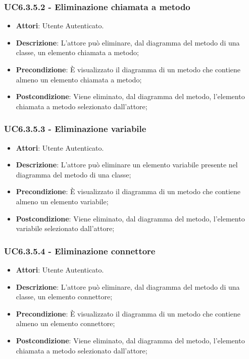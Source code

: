 \subsubsection{UC6.3.5.2 - Eliminazione chiamata a metodo} 
\label{sssec:UC6.3.5.2} 
\begin{itemize} 
\item \textbf{Attori}: Utente Autenticato.
\item \textbf{Descrizione}: L'attore può eliminare, dal diagramma del metodo di una classe, un elemento chiamata a metodo;
\item \textbf{Precondizione}: È visualizzato il diagramma di un metodo che contiene almeno un elemento chiamata a metodo;
\item \textbf{Postcondizione}: Viene eliminato, dal diagramma del metodo,  l'elemento chiamata a metodo selezionato dall'attore;
\end{itemize} 
\subsubsection{UC6.3.5.3 - Eliminazione variabile} 
\label{sssec:UC6.3.5.3} 
\begin{itemize} 
\item \textbf{Attori}: Utente Autenticato.
\item \textbf{Descrizione}: L'attore può eliminare un elemento variabile presente nel diagramma del metodo di una classe;
\item \textbf{Precondizione}: È visualizzato il diagramma di un metodo che contiene almeno un elemento variabile;
\item \textbf{Postcondizione}: Viene eliminato, dal diagramma del metodo,  l'elemento variabile selezionato dall'attore;
\end{itemize} 
\subsubsection{UC6.3.5.4 - Eliminazione connettore} 
\label{sssec:UC6.3.5.4} 
\begin{itemize} 
\item \textbf{Attori}: Utente Autenticato.
\item \textbf{Descrizione}: L'attore può eliminare, dal diagramma del metodo di una classe, un elemento connettore;
\item \textbf{Precondizione}: È visualizzato il diagramma di un metodo che contiene almeno un elemento connettore;
\item \textbf{Postcondizione}: Viene eliminato, dal diagramma del metodo,  l'elemento chiamata a metodo selezionato dall'attore;
\end{itemize} 

